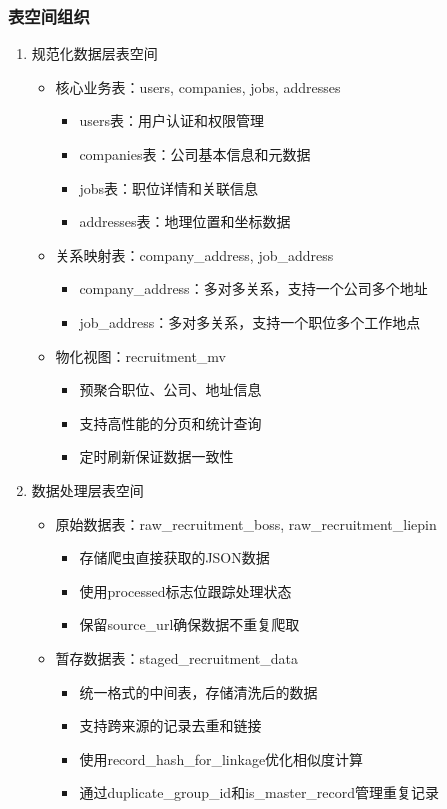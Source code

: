   \subsubsection{表空间组织}
  
  \begin{enumerate}
    \item 规范化数据层表空间
    \begin{itemize}
      \item 核心业务表：users, companies, jobs, addresses
      \begin{itemize}
        \item users表：用户认证和权限管理
        \item companies表：公司基本信息和元数据
        \item jobs表：职位详情和关联信息
        \item addresses表：地理位置和坐标数据
      \end{itemize}
      \item 关系映射表：company\_address, job\_address
      \begin{itemize}
        \item company\_address：多对多关系，支持一个公司多个地址
        \item job\_address：多对多关系，支持一个职位多个工作地点
      \end{itemize}
      \item 物化视图：recruitment\_mv
      \begin{itemize}
        \item 预聚合职位、公司、地址信息
        \item 支持高性能的分页和统计查询
        \item 定时刷新保证数据一致性
      \end{itemize}
    \end{itemize}
  
    \item 数据处理层表空间
    \begin{itemize}
      \item 原始数据表：raw\_recruitment\_boss, raw\_recruitment\_liepin
      \begin{itemize}
        \item 存储爬虫直接获取的JSON数据
        \item 使用processed标志位跟踪处理状态
        \item 保留source\_url确保数据不重复爬取
      \end{itemize}
      \item 暂存数据表：staged\_recruitment\_data
      \begin{itemize}
        \item 统一格式的中间表，存储清洗后的数据
        \item 支持跨来源的记录去重和链接
        \item 使用record\_hash\_for\_linkage优化相似度计算
        \item 通过duplicate\_group\_id和is\_master\_record管理重复记录
      \end{itemize}
    \end{itemize}
  \end{enumerate}
  
